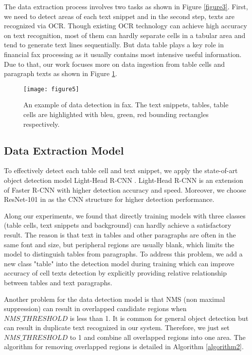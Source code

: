 \documentclass[sigconf]{acmart}
\begin{document}
The data extraction process involves two tasks as shown in Figure \ref{figure3}. First, we need to detect areas of each text snippet and in the second step, texts are recognized via OCR. Though existing OCR technology can achieve high accuracy on text recognition, most of them can hardly separate cells in a tabular area and tend to generate text lines sequentially. But data table plays a key role in financial fax processing as it usually contains most intensive useful information. Due to that, our work focuses more on data ingestion from table cells and paragraph texts as shown in Figure \ref{figure5}.


\begin{figure}[h]
	\centering
	\texttt{[image: figure5]}
	\caption{An example of data detection in fax. The text snippets, tables, table cells are highlighted with bleu, green, red bounding rectangles respectively. }
	\label{figure5}
\end{figure}

\subsection{Data Extraction Model}
To effectively detect each table cell and text snippet, we apply the state-of-art object detection model Light-Head R-CNN \cite{li2017light}. Light-Head R-CNN is an extension of Faster R-CNN with higher detection accuracy and speed. Moreover, we choose ResNet-101 in \cite{he2016deep} as the CNN structure for higher detection performance.

Along our experiments, we found that directly training models with three classes (table cells, text snippets and background) can hardly achieve a satisfactory result. The reason is that text in tables and other paragraphs are often in the same font and size, but peripheral regions are usually blank, which limits the model to distinguish tables from paragraphs. To address this problem, we add a new class "table" into the detection model during training which can improve accuracy of cell texts detection by explicitly providing relative relationship between tables and text paragraphs.

Another problem for the data detection model is that NMS (non maximal suppression) can result in overlapped candidate regions when $NMS\_THRESHOLD$ is less than 1. It is common for general object detection but can result in duplicate text recognized in our system. Therefore, we just set $NMS\_THRESHOLD$ to 1 and combine all overlapped regions into one area. The algorithm for removing overlapped regions is detailed in Algorithm \ref{algorithm2}.
\end{document}
